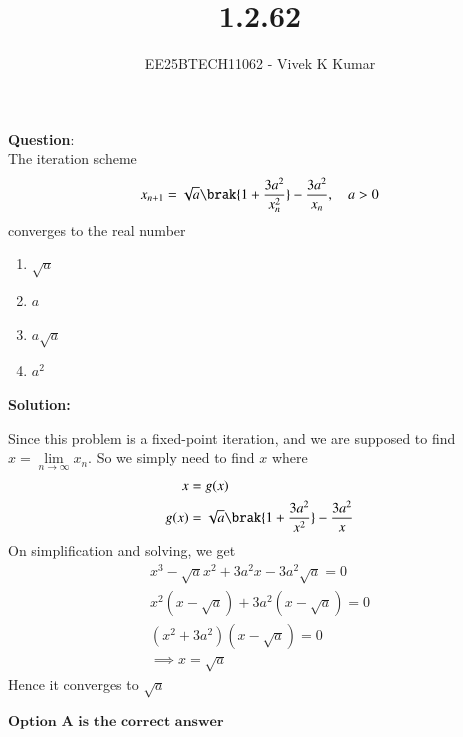 \documentclass[journal]{IEEEtran}
\title{1.2.62}
\author{EE25BTECH11062 - Vivek K Kumar}
\begin{document}
\maketitle

\renewcommand{\thefigure}{\theenumi}
\renewcommand{\thetable}{\theenumi}


\textbf{Question}:\\
The iteration scheme
\begin{align}
    x_{n+1} = \sqrt{a}\brak{1+\frac{3a^2}{x_n^2}} - \frac{3a^2}{x_n}, \quad a>0
\end{align}
converges to the real number
\begin{enumerate}
    \item $\sqrt{a}$
    \item $a$
    \item $a\sqrt{a}$
    \item $a^2$
\end{enumerate}
\textbf{Solution: }

Since this problem is a fixed-point iteration, and we are supposed to find $x = \lim\limits_{n\to\infty} x_n$. So we simply need to find $x$ where
\begin{align}
    x &= g(x) \label{eq:1} \\
    g(x) &= \sqrt{a}\brak{1+\frac{3a^2}{x^2}} - \frac{3a^2}{x}
\end{align}
On simplification and solving, we get
\begin{align}
    x^3 -\sqrt{a}x^2 + 3a^2x - 3a^2\sqrt{a} = 0\\
    x^2(x-\sqrt{a}) + 3a^2(x-\sqrt{a})=0\\
    (x^2+3a^2)(x-\sqrt{a}) =0 \\
    \implies x= \sqrt{a} \label{eq:3}
\end{align}
Hence it converges to $\sqrt{a}$

\begin{center}
$\boxed{\textbf{Option A is the correct answer}}$
\end{center}
\end{document}
